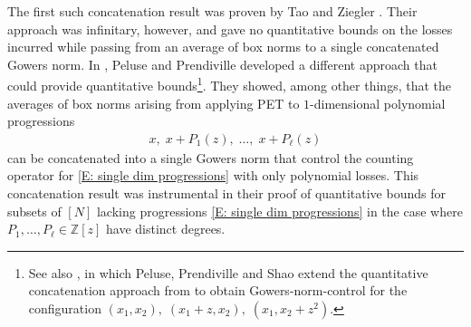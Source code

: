 \documentclass[11pt]{amsart}
\theoremstyle{definition}
\newcommand{\Z}{{\mathbb Z}}
\begin{document}
The first such concatenation result was proven by Tao and Ziegler \cite{TZ16}.  Their approach was infinitary, however, and gave no quantitative bounds on the losses incurred while passing from an average of box norms to a single concatenated Gowers norm. In \cite{Pel20, PP19}, Peluse and Prendiville developed a different approach that could provide quantitative bounds\footnote{See also \cite{PPS24}, in which Peluse, Prendiville and Shao extend the quantitative concatenation approach from \cite{PP19} to obtain Gowers-norm-control for the configuration $(x_1, x_2),\; (x_1+z, x_2),\; (x_1, x_2+z^2)$.}. They showed, among other things, that the averages of box norms arising from applying PET to $1$-dimensional polynomial progressions
\begin{align}\label{E: single dim progressions}
    x, \; x + P_1(z),\; \ldots,\; x + P_\ell(z)
\end{align}
can be concatenated into a single Gowers norm that control the counting operator for \eqref{E: single dim progressions} with only polynomial losses. This concatenation result was instrumental in their proof of quantitative bounds for subsets of $[N]$ lacking progressions \eqref{E: single dim progressions} in the case where $P_1, \ldots, P_\ell\in\Z[z]$ have distinct degrees.
\end{document}
